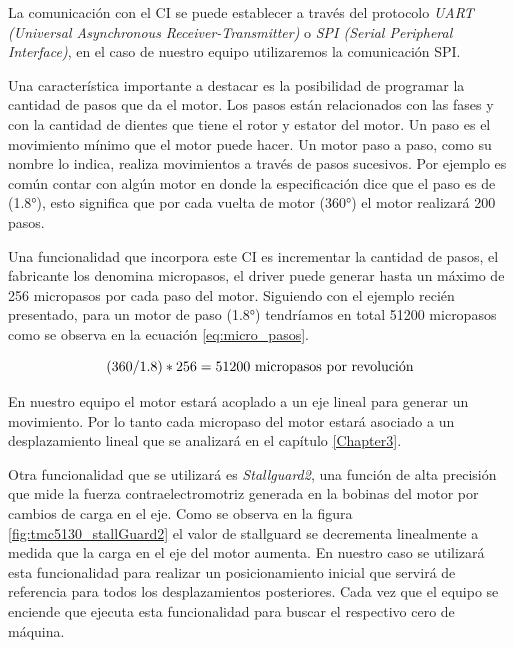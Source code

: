 
La comunicación con el CI se puede establecer a través del protocolo \textit{ UART (Universal Asynchronous Receiver-Transmitter)} o \textit{SPI (Serial Peripheral Interface)}, en el caso de nuestro equipo utilizaremos la comunicación SPI.


Una característica importante a destacar es la posibilidad de programar la cantidad de pasos que da el motor. Los pasos están relacionados con las fases  y con la cantidad de dientes que tiene el rotor y estator del motor. Un paso es el movimiento mínimo que el motor puede hacer. Un motor paso a paso, como su nombre lo indica, realiza movimientos a través de pasos sucesivos. Por ejemplo es común contar con algún motor en donde la especificación dice que el paso es de (\ang{1.8}), esto significa que por cada vuelta de motor (\ang{360}) el motor realizará 200 pasos.

Una funcionalidad que incorpora este CI es incrementar la cantidad de pasos, el fabricante los denomina micropasos, el driver puede generar hasta un máximo de 256 micropasos por cada paso del motor. Siguiendo con el ejemplo recién presentado, para un motor de paso (\ang{1.8}) tendríamos en total 51200 micropasos como se observa en la ecuación \ref{eq:micro_pasos}.

\begin{equation}
	\label{eq:micro_pasos}
		(360/1.8) * 256 = 51200 \textup{ micropasos por revolución}
\end{equation}

En nuestro equipo el motor estará acoplado a un eje lineal para generar un movimiento. Por lo tanto cada micropaso del motor estará asociado a un desplazamiento lineal que se analizará en el capítulo \ref{Chapter3}.

Otra funcionalidad que se utilizará es \textit{Stallguard2}, una función de alta precisión que mide la fuerza contraelectromotriz generada en la bobinas del motor por cambios de carga en el eje. Como se observa en la figura \ref{fig:tmc5130_stallGuard2} el valor de stallguard se decrementa linealmente a medida que la carga en el eje del motor aumenta. En nuestro caso se utilizará esta funcionalidad para realizar un posicionamiento inicial que servirá de referencia para todos los desplazamientos posteriores. Cada vez que el equipo se enciende que ejecuta esta funcionalidad para buscar el respectivo cero de máquina.
     

